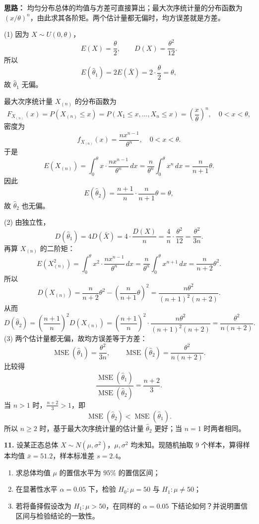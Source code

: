 \ifshowsolutions%
\textbf{思路：} 均匀分布总体的均值与方差可直接算出；最大次序统计量的分布函数为 $(x/\theta)^n$，由此求其各阶矩。两个估计量都无偏时，均方误差就是方差。

(1) 因为 $X\sim U(0,\theta)$，
\[
E(X)=\frac{\theta}{2},\qquad D(X)=\frac{\theta^2}{12}.
\]
所以
\[
E(\hat\theta_1)=2E(\bar X)=2\cdot\frac{\theta}{2}=\theta,
\]
故 $\hat\theta_1$ 无偏。

最大次序统计量 $X_{(n)}$ 的分布函数为
\[
F_{X_{(n)}}(x)=P(X_{(n)}\leq x)=P(X_1\leq x,\ldots,X_n\leq x)
=\left(\frac{x}{\theta}\right)^n,\quad 0<x<\theta,
\]
密度为
\[
f_{X_{(n)}}(x)=\frac{n x^{n-1}}{\theta^n},\quad 0<x<\theta.
\]
于是
\[
E(X_{(n)})=\int_0^\theta x\cdot\frac{n x^{n-1}}{\theta^n}\,dx
=\frac{n}{\theta^n}\int_0^\theta x^n\,dx
=\frac{n}{n+1}\theta.
\]
因此
\[
E(\hat\theta_2)=\frac{n+1}{n}\cdot\frac{n}{n+1}\theta=\theta,
\]
故 $\hat\theta_2$ 也无偏。

(2) 由独立性，
\[
D(\hat\theta_1)=4D(\bar X)=4\cdot\frac{D(X)}{n}
=\frac{4}{n}\cdot\frac{\theta^2}{12}=\frac{\theta^2}{3n}.
\]
再算 $X_{(n)}$ 的二阶矩：
\[
E(X_{(n)}^2)=\int_0^\theta x^2\cdot\frac{n x^{n-1}}{\theta^n}\,dx
=\frac{n}{\theta^n}\int_0^\theta x^{n+1}\,dx
=\frac{n}{n+2}\theta^2.
\]
所以
\[
D(X_{(n)})=\frac{n}{n+2}\theta^2-\left(\frac{n}{n+1}\theta\right)^2
=\frac{n\theta^2}{(n+1)^2(n+2)}.
\]
从而
\[
D(\hat\theta_2)=\left(\frac{n+1}{n}\right)^2D(X_{(n)})
=\left(\frac{n+1}{n}\right)^2\cdot\frac{n\theta^2}{(n+1)^2(n+2)}
=\frac{\theta^2}{n(n+2)}.
\]
(3) 两个估计量都无偏，故均方误差等于方差：
\[
\operatorname{MSE}(\hat\theta_1)=\frac{\theta^2}{3n},\qquad
\operatorname{MSE}(\hat\theta_2)=\frac{\theta^2}{n(n+2)}.
\]
比较得
\[
\frac{\operatorname{MSE}(\hat\theta_1)}{\operatorname{MSE}(\hat\theta_2)}
=\frac{n+2}{3}.
\]
当 $n>1$ 时，$\frac{n+2}{3}>1$，即
\[
\operatorname{MSE}(\hat\theta_2)<\operatorname{MSE}(\hat\theta_1).
\]
所以 $n\geq2$ 时，基于最大次序统计量的估计量 $\hat\theta_2$ 更好；当 $n=1$ 时两者相同。


\else \answerarea[10] \fi%

\textbf{11.} 设某正态总体 $X\sim N(\mu,\sigma^2)$，$\mu,\sigma^2$ 均未知。现随机抽取 $9$ 个样本，算得样本均值 $\bar x=51.2$，样本标准差 $s=2.4$。
\begin{enumerate}
    \item[(1)] 求总体均值 $\mu$ 的置信水平为 $95\%$ 的置信区间；
    \item[(2)] 在显著性水平 $\alpha=0.05$ 下，检验 $H_0:\mu=50$ 与 $H_1:\mu\neq50$；
    \item[(3)] 若将备择假设改为 $H_1:\mu>50$，在同样的 $\alpha=0.05$ 下结论如何？并说明置信区间与检验结论的一致性。
\end{enumerate}

